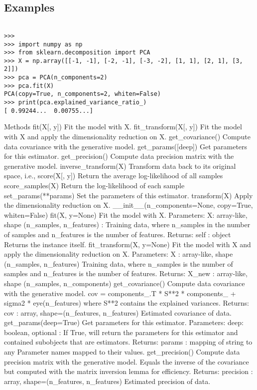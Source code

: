 \subsection*{Examples}
\begin{framed}
\begin{verbatim}

>>>
>>> import numpy as np
>>> from sklearn.decomposition import PCA
>>> X = np.array([[-1, -1], [-2, -1], [-3, -2], [1, 1], [2, 1], [3, 2]])
>>> pca = PCA(n_components=2)
>>> pca.fit(X)
PCA(copy=True, n_components=2, whiten=False)
>>> print(pca.explained_variance_ratio_) 
[ 0.99244...  0.00755...]
\end{verbatim}
\end{framed}
Methods
fit(X[, y])	Fit the model with X.
fit_transform(X[, y])	Fit the model with X and apply the dimensionality reduction on X.
get_covariance()	Compute data covariance with the generative model.
get_params([deep])	Get parameters for this estimator.
get_precision()	Compute data precision matrix with the generative model.
inverse_transform(X)	Transform data back to its original space, i.e.,
score(X[, y])	Return the average log-likelihood of all samples
score_samples(X)	Return the log-likelihood of each sample
set_params(**params)	Set the parameters of this estimator.
transform(X)	Apply the dimensionality reduction on X.
__init__(n_components=None, copy=True, whiten=False)
fit(X, y=None)
Fit the model with X.
Parameters:	
X: array-like, shape (n_samples, n_features) :
Training data, where n_samples in the number of samples and n_features is the number of features.
Returns:	
self : object
Returns the instance itself.
fit_transform(X, y=None)
Fit the model with X and apply the dimensionality reduction on X.
Parameters:	
X : array-like, shape (n_samples, n_features)
Training data, where n_samples is the number of samples and n_features is the number of features.
Returns:	
X_new : array-like, shape (n_samples, n_components)
get_covariance()
Compute data covariance with the generative model.
cov = components_.T * S**2 * components_ + sigma2 * eye(n_features) where S**2 contains the explained variances.
Returns:	
cov : array, shape=(n_features, n_features)
Estimated covariance of data.
get_params(deep=True)
Get parameters for this estimator.
Parameters:	
deep: boolean, optional :
If True, will return the parameters for this estimator and contained subobjects that are estimators.
Returns:	
params : mapping of string to any
Parameter names mapped to their values.
get_precision()
Compute data precision matrix with the generative model.
Equals the inverse of the covariance but computed with the matrix inversion lemma for efficiency.
Returns:	
precision : array, shape=(n_features, n_features)
Estimated precision of data.
